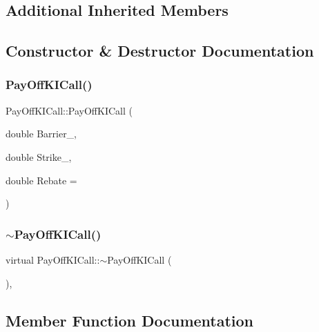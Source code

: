 \subsection*{Additional Inherited Members}


\subsection{Constructor \& Destructor Documentation}
\hypertarget{classPayOffKICall_ae9e4e8412e6c51e6642d0d9d77c7e644}{}\label{classPayOffKICall_ae9e4e8412e6c51e6642d0d9d77c7e644} 
\subsubsection{\texorpdfstring{Pay\+Off\+K\+I\+Call()}{PayOffKICall()}}
{\footnotesize\ttfamily Pay\+Off\+K\+I\+Call\+::\+Pay\+Off\+K\+I\+Call (\begin{DoxyParamCaption}\item[{double}]{Barrier\+\_\+,  }\item[{double}]{Strike\+\_\+,  }\item[{double}]{Rebate = {} }\end{DoxyParamCaption})}

\hypertarget{classPayOffKICall_a94543d709558c055c9ab3ba6ae7b3f42}{}\label{classPayOffKICall_a94543d709558c055c9ab3ba6ae7b3f42} 
\subsubsection{\texorpdfstring{$\sim$\+Pay\+Off\+K\+I\+Call()}{~PayOffKICall()}}
{\footnotesize\ttfamily virtual Pay\+Off\+K\+I\+Call\+::$\sim$\+Pay\+Off\+K\+I\+Call (\begin{DoxyParamCaption}{ }\end{DoxyParamCaption})\hspace{0.3cm}{\ttfamily [inline]}, {\ttfamily [virtual]}}



\subsection{Member Function Documentation}
\hypertarget{classPayOffKICall_a88d8fbd976608d0a4da969e638a261b4}{}\label{classPayOffKICall_a88d8fbd976608d0a4da969e638a261b4} 
